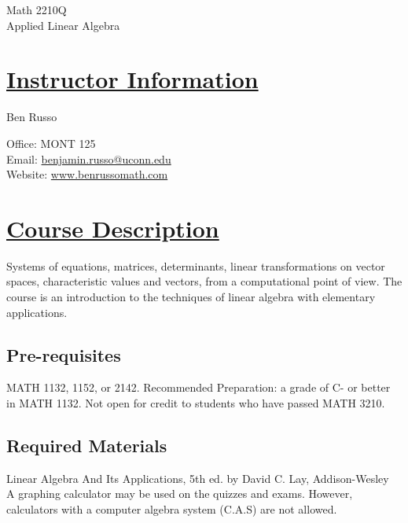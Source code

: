 \documentclass[11pt]{article}
\begin{document}
\begin{center}
{\LARGE Math 2210Q}\\
Applied Linear Algebra\\
\end{center}

\section*{\underline{Instructor Information}}
Ben Russo

\noindent 
Office: MONT 125\\
Email:  \href{mailto:benjamin.russo@uconn.edu}{benjamin.russo@uconn.edu}\\
Website: \href{http://www.benrussomath.com}{www.benrussomath.com}
\section*{\underline{Course Description}}
Systems of equations, matrices, determinants, linear transformations on vector spaces, characteristic values and vectors, from a computational point of view. The course is an introduction to the techniques of linear algebra with elementary applications.
\subsection*{Pre-requisites}
MATH 1132, 1152, or 2142. Recommended Preparation: a grade of C- or better in MATH 1132. Not open for credit to students who have passed MATH 3210.
\subsection*{Required Materials}
Linear Algebra And Its Applications, 5th ed. by David C. Lay, Addison-Wesley \\

\noindent A graphing calculator may be used on the quizzes and exams. However, calculators with a computer algebra system (C.A.S) are not allowed. 

\end{document}
